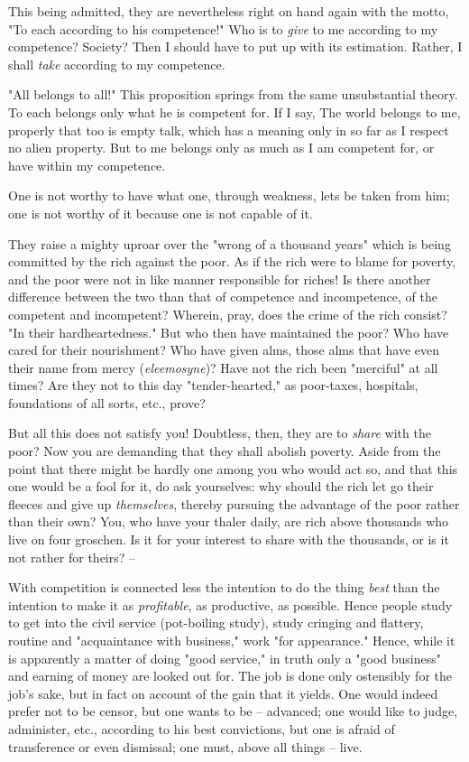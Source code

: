 This being admitted, they are nevertheless right on hand again with the motto, 
"{}To each according to his competence!"{} Who is to \textit{give} to me 
according to my competence? Society? Then I should have to put up with its 
estimation. Rather, I shall \textit{take} according to my competence.

"{}All belongs to all!"{} This proposition springs from the same unsubstantial 
theory. To each belongs only what he is competent for. If I say, The world 
belongs to me, properly that too is empty talk, which has a meaning only in so 
far as I respect no alien property. But to me belongs only as much as I am 
competent for, or have within my competence.

One is not worthy to have what one, through weakness, lets be taken from him; 
one is not worthy of it because one is not capable of it.

They raise a mighty uproar over the "{}wrong of a thousand years"{} which is 
being committed by the rich against the poor. As if the rich were to blame for 
poverty, and the poor were not in like manner responsible for riches! Is there 
another difference between the two than that of competence and incompetence, 
of the competent and incompetent? Wherein, pray, does the crime of the rich 
consist? "{}In their hardheartedness."{} But who then have maintained the 
poor? Who have cared for their nourishment? Who have given alms, those alms 
that have even their name from mercy (\textit{eleemosyne})? Have not the rich 
been "{}merciful"{} at all times? Are they not to this day 
"{}tender-hearted,"{} as poor-taxes, hospitals, foundations of all sorts, 
etc., prove?

But all this does not satisfy you! Doubtless, then, they are to \textit{share} 
with the poor? Now you are demanding that they shall abolish poverty. Aside 
from the point that there might be hardly one among you who would act so, and 
that this one would be a fool for it, do ask yourselves: why should the rich 
let go their fleeces and give up \textit{themselves}, thereby pursuing the 
advantage of the poor rather than their own? You, who have your thaler daily, 
are rich above thousands who live on four groschen. Is it for your interest to 
share with the thousands, or is it not rather for theirs? --

With competition is connected less the intention to do the thing \textit{best} 
than the intention to make it as \textit{profitable}, as productive, as 
possible. Hence people study to get into the civil service (pot-boiling 
study), study cringing and flattery, routine and "{}acquaintance with 
business,"{} work "{}for appearance."{} Hence, while it is apparently a matter 
of doing "{}good service,"{} in truth only a "{}good business"{} and earning 
of money are looked out for. The job is done only ostensibly for the job's 
sake, but in fact on account of the gain that it yields. One would indeed 
prefer not to be censor, but one wants to be -- advanced; one would like to 
judge, administer, etc., according to his best convictions, but one is afraid 
of transference or even dismissal; one must, above all things -- live.

